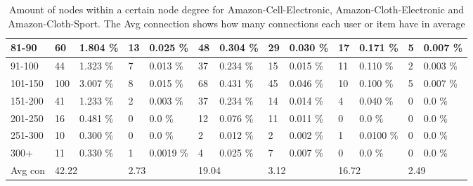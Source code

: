 \begin{table*}[]
\begin{tabular}{|l|l|l|l|l|l|l|l|l|l|l|l|l|}
        81-90   & 60                                          & 1.804 \%                                       & 13                                      & 0.025 \%                     & 48                         & 0.304 \%                     & 29    & 0.030 \%& 17   & 0.171 \% & 5     & 0.007 \%\\ \hline
        91-100  & 44                                          & 1.323 \%                                       & 7                                       & 0.013 \%                     & 37                         & 0.234 \%                     & 15    & 0.015 \%& 11   & 0.110 \% & 2     & 0.003 \%\\ \hline
        101-150 & 100                                         & 3.007 \%                                       & 8                                       & 0.015 \%                     & 68                         & 0.431 \%                     & 45    & 0.046 \%& 10   & 0.100 \% & 5     & 0.007 \%\\ \hline
        151-200 & 41                                          & 1.233 \%                                       & 2                                       & 0.003 \%                     & 37                         & 0.234 \%                     & 14    & 0.014 \%& 4    & 0.040 \% & 0     & 0.0 \%\\ \hline
        201-250 & 16                                          & 0.481 \%                                       & 0                                       & 0.0 \%                       & 12                         & 0.076 \%                     & 11    & 0.011 \%& 0    & 0.0 \%   & 0     & 0.0 \%   \\ \hline
        251-300 & 10                                          & 0.300 \%                                       & 0                                       & 0.0 \%                       & 2                          & 0.012 \%                     & 2     & 0.002 \%& 1    & 0.0100 \% & 0     & 0.0 \%  \\ \hline
        300+    & 11                                          & 0.330 \%                                       & 1                                       & 0.0019 \%                    & 4                          & 0.025 \%                     & 7     & 0.007 \%& 0    & 0.0 \%    & 0     & 0.0 \%  \\ \hline
        Avg con & \multicolumn{2}{l|}{42.22}                  & \multicolumn{2}{l|}{2.73}                    & \multicolumn{2}{l|}{19.04}              & \multicolumn{2}{l|}{3.12}  & \multicolumn{2}{l|}{16.72} & \multicolumn{2}{l|}{2.49}                                                  \\ \hline
    \end{tabular}
    \caption{Amount of nodes within a certain node degree for Amazon-Cell-Electronic, Amazon-Cloth-Electronic and Amazon-Cloth-Sport. The Avg connection shows how many connections each user or item have in average}
    \label{tab:node-degrees-cell-sport-electronic}
\end{table*}
